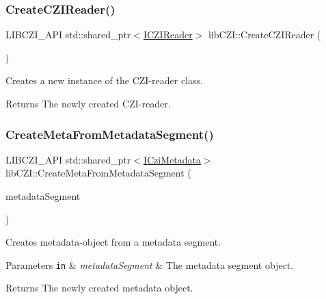 \subsubsection{\texorpdfstring{Create\+C\+Z\+I\+Reader()}{CreateCZIReader()}}
{\footnotesize\ttfamily L\+I\+B\+C\+Z\+I\+\_\+\+A\+PI std\+::shared\+\_\+ptr$<$\hyperlink{classlib_c_z_i_1_1_i_c_z_i_reader}{I\+C\+Z\+I\+Reader}$>$ lib\+C\+Z\+I\+::\+Create\+C\+Z\+I\+Reader (\begin{DoxyParamCaption}{ }\end{DoxyParamCaption})}

Creates a new instance of the C\+Z\+I-\/reader class. \begin{DoxyReturn}{Returns}
The newly created C\+Z\+I-\/reader. 
\end{DoxyReturn}
\mbox{\label{namespacelib_c_z_i_a69621b531d30747728a2fd37eb5286c2}} 
\subsubsection{\texorpdfstring{Create\+Meta\+From\+Metadata\+Segment()}{CreateMetaFromMetadataSegment()}}
{\footnotesize\ttfamily L\+I\+B\+C\+Z\+I\+\_\+\+A\+PI std\+::shared\+\_\+ptr$<$\hyperlink{classlib_c_z_i_1_1_i_czi_metadata}{I\+Czi\+Metadata}$>$ lib\+C\+Z\+I\+::\+Create\+Meta\+From\+Metadata\+Segment (\begin{DoxyParamCaption}\item[{\hyperlink{classlib_c_z_i_1_1_i_metadata_segment}{I\+Metadata\+Segment} $\ast$}]{metadata\+Segment }\end{DoxyParamCaption})}

Creates metadata-\/object from a metadata segment. 
\begin{DoxyParams}[1]{Parameters}
\mbox{\tt in}  & {\em metadata\+Segment} & The metadata segment object. \\
\hline
\end{DoxyParams}
\begin{DoxyReturn}{Returns}
The newly created metadata object. 
\end{DoxyReturn}
\mbox{\label{namespacelib_c_z_i_a8783cf40c0eac418632db90c4f20b43b}} 
